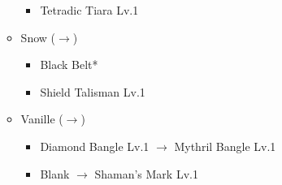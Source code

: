 \begin{menu}
\begin{itemize}
\begin{itemize}
\begin{itemize}
					\item Tetradic Tiara Lv.1
				\end{itemize}
			\item Snow ($\rightarrow$)
				\begin{itemize}
					\item Black Belt*
					\item Shield Talisman Lv.1
				\end{itemize}
			\item Vanille ($\rightarrow$)
				\begin{itemize}
					\item Diamond Bangle Lv.1 $\rightarrow$ Mythril Bangle Lv.1
					\item Blank $\rightarrow$ Shaman's Mark Lv.1
				\end{itemize}
		\end{itemize}
	\end{itemize}
\end{menu}